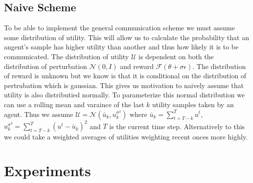 
\subsection{Naive Scheme}
\label{sec:NaiveScheme}

To be able to implement the general communication scheme we must assume some distribution of utility. This will allow us to calculate the probability that an angent's sample has higher utility than another and thus how likely it is to be communicated. The distribution of utility $\mathcal{U}$ is dependent on both the distribution of perturbation $\mathcal{N}(0,I)$ and reward $\mathcal{F}(\theta +\sigma \epsilon)$. The distribution of reward is unknown but we know is that it is conditional on the distribution of pertrubation which is gaussian. This gives us motivation to naively assume that utility is also distributied normally. To parameterize this normal distribution we can use a rolling mean and varaince of the last $k$ utility samples taken by an agent. Thus we assume $\mathcal{U} = \mathcal{N}(\bar{u}_k, u^{\sigma^2}_k)$ where $\bar{u}_k = \sum_{t=T-k}^T u^t$, $u^{\sigma^2}_k = \sum_{t=T-k}^T (u^t - \bar{u}_k)^2$ and $T$ is the current time step. Alternatively to this we could take a weighted averages of utilities weighting recent onces more highly.


\section{Experiments}

